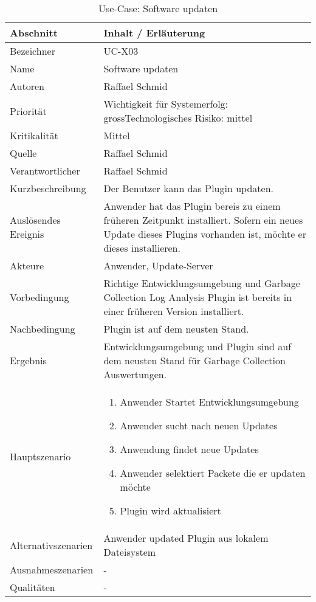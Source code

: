 \begin{longtable}{|p{4cm}|p{10.5cm}|}
\caption{Use-Case: Software updaten}\\\hline
   \textbf{Abschnitt} & \textbf{Inhalt / Erläuterung} \\\hline
   Bezeichner & UC-X03\\\hline
   Name & Software updaten\\\hline
   Autoren & Raffael Schmid\\\hline
   Priorität & Wichtigkeit für Systemerfolg: gross\newline Technologisches Risiko: mittel\\\hline
   Kritikalität & Mittel\\\hline
   Quelle & Raffael Schmid\\\hline
   Verantwortlicher & Raffael Schmid\\\hline
   Kurzbeschreibung & Der Benutzer kann das Plugin updaten.\\\hline
   Auslösendes Ereignis & Anwender hat das Plugin bereis zu einem früheren Zeitpunkt installiert. Sofern ein neues Update dieses Plugins vorhanden ist, möchte er dieses installieren.\\\hline
   Akteure & Anwender, Update-Server\\\hline
   Vorbedingung & Richtige Entwicklungsumgebung und Garbage Collection Log Analysis Plugin ist bereits in einer früheren Version installiert.\\\hline
   Nachbedingung & Plugin ist auf dem neusten Stand.\\\hline
   Ergebnis & Entwicklungsumgebung und Plugin sind auf dem neusten Stand für Garbage Collection Auswertungen.\\\hline
   Hauptszenario & 
	\begin{enumerate}
		\item Anwender Startet Entwicklungsumgebung
		\item Anwender sucht nach neuen Updates
		\item Anwendung findet neue Updates
		\item Anwender selektiert Packete die er updaten möchte
		\item Plugin wird aktualisiert
	\end{enumerate}
	\\\hline
   Alternativszenarien & Anwender updated Plugin aus lokalem Dateisystem\\\hline
   Ausnahmeszenarien & -\\\hline
   Qualitäten & -\\\hline
\end{longtable}

